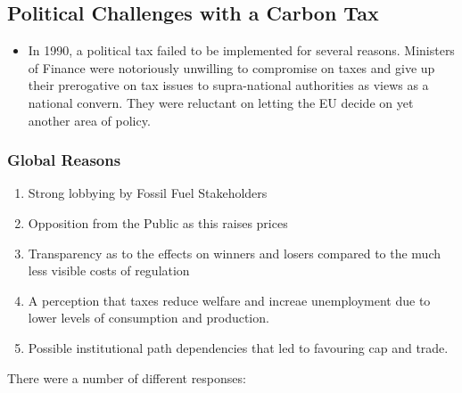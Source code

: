 \documentclass[12pt]{article}
\begin{document}
    \subsection{Political Challenges with a Carbon Tax}
    \begin{itemize}
        \item In 1990, a political tax failed to be implemented for several reasons. Ministers of Finance were notoriously unwilling to compromise on taxes and give up
              their prerogative on tax issues to supra-national authorities as views as a national convern. They were reluctant on letting the EU decide on yet another area of policy.
    \end{itemize}
    \subsubsection{Global Reasons}
    \begin{enumerate}
        \item Strong lobbying by Fossil Fuel Stakeholders
        \item Opposition from the Public as this raises prices
        \item Transparency as to the effects on winners and losers compared to the much less visible costs of regulation
        \item A perception that taxes reduce welfare and increae unemployment due to lower levels of consumption and production.
        \item Possible institutional path dependencies that led to favouring cap and trade.
    \end{enumerate}
    There were a number of different responses:
\end{document}
